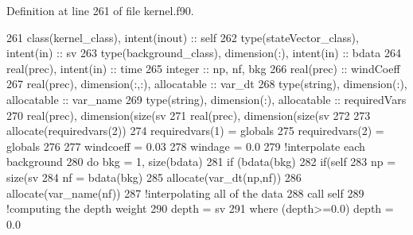 Definition at line 261 of file kernel.\+f90.


\begin{DoxyCode}
261     \textcolor{keywordtype}{class}(kernel\_class), \textcolor{keywordtype}{intent(inout)} :: self
262     \textcolor{keywordtype}{type}(stateVector\_class), \textcolor{keywordtype}{intent(in)} :: sv
263     \textcolor{keywordtype}{type}(background\_class), \textcolor{keywordtype}{dimension(:)}, \textcolor{keywordtype}{intent(in)} :: bdata
264     \textcolor{keywordtype}{real(prec)}, \textcolor{keywordtype}{intent(in)} :: time
265     \textcolor{keywordtype}{integer} :: np, nf, bkg
266     \textcolor{keywordtype}{real(prec)} :: windCoeff
267     \textcolor{keywordtype}{real(prec)}, \textcolor{keywordtype}{dimension(:,:)}, \textcolor{keywordtype}{allocatable} :: var\_dt
268     \textcolor{keywordtype}{type}(string), \textcolor{keywordtype}{dimension(:)}, \textcolor{keywordtype}{allocatable} :: var\_name
269     \textcolor{keywordtype}{type}(string), \textcolor{keywordtype}{dimension(:)}, \textcolor{keywordtype}{allocatable} :: requiredVars
270     \textcolor{keywordtype}{real(prec)}, \textcolor{keywordtype}{dimension(size(sv%
271     \textcolor{keywordtype}{real(prec)}, \textcolor{keywordtype}{dimension(size(sv%
272 
273     \textcolor{keyword}{allocate}(requiredvars(2))
274     requiredvars(1) = globals%
275     requiredvars(2) = globals%
276 
277     windcoeff = 0.03
278     windage = 0.0
279     \textcolor{comment}{!interpolate each background}
280     \textcolor{keywordflow}{do} bkg = 1, \textcolor{keyword}{size}(bdata)
281         \textcolor{keywordflow}{if} (bdata(bkg)%
282             \textcolor{keywordflow}{if}(self%
283                 np = \textcolor{keyword}{size}(sv%
284                 nf = bdata(bkg)%
285                 \textcolor{keyword}{allocate}(var\_dt(np,nf))
286                 \textcolor{keyword}{allocate}(var\_name(nf))
287                 \textcolor{comment}{!interpolating all of the data}
288                 \textcolor{keyword}{call }self%
289                 \textcolor{comment}{!computing the depth weight}
290                 depth = sv%
291                 \textcolor{keywordflow}{where} (depth>=0.0) depth = 0.0
}}
\end{DoxyCode}
